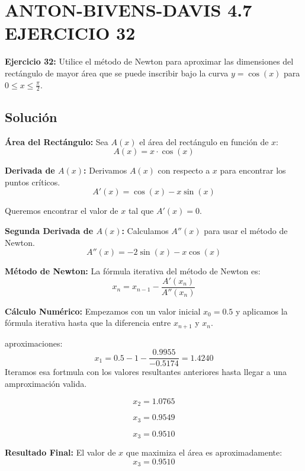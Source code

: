 
\chapter*{ANTON-BIVENS-DAVIS 4.7 EJERCICIO 32}

\textbf{Ejercicio 32:} Utilice el método de Newton para aproximar las dimensiones del rectángulo de mayor área que se puede inscribir bajo la curva \( y = \cos(x) \) para \( 0 \leq x \leq \frac{\pi}{2} \).

\section*{Solución}

\textbf{Área del Rectángulo:} Sea \( A(x) \) el área del rectángulo en función de \( x \):
   \begin{equation}
       A(x) = x \cdot \cos(x)
   \end{equation}

\textbf{Derivada de \( A(x) \):} Derivamos \( A(x) \) con respecto a \( x \) para encontrar los puntos críticos.
   \begin{equation}
       A'(x) = \cos(x) - x \sin(x)
   \end{equation}

   Queremos encontrar el valor de \( x \) tal que \( A'(x) = 0 \).

 \textbf{Segunda Derivada de \( A(x) \):} Calculamos \( A''(x) \) para usar el método de Newton.
   \begin{equation}
       A''(x) = -2 \sin(x) - x \cos(x)
   \end{equation}

\textbf{Método de Newton:} La fórmula iterativa del método de Newton es:
   \begin{equation}
       x_n = x_{n-1} - \frac{A'(x_n)}{A''(x_n)}
   \end{equation}

\textbf{Cálculo Numérico:} Empezamos con un valor inicial \( x_0 = 0.5 \) y aplicamos la fórmula iterativa hasta que la diferencia entre \( x_{n+1} \) y \( x_n \).

aproximaciones: 
  \begin{equation}
       x_1 = 0.5 - 1 - \frac{0.9955}{-0.5174} = 1.4240
   \end{equation}
   Iteramos esa fortmula con los valores resultantes anteriores hasta llegar a una amproximación valida.

   \begin{equation}
       x_2 = 1.0765
   \end{equation}

   \begin{equation}
       x_3 = 0.9549
    \end{equation}

    \begin{equation}
       x_3 = 0.9510
    \end{equation}


\textbf{Resultado Final:} El valor de \( x \) que maximiza el área es aproximadamente:
   \begin{equation}
       x_3 = 0.9510
   \end{equation}
